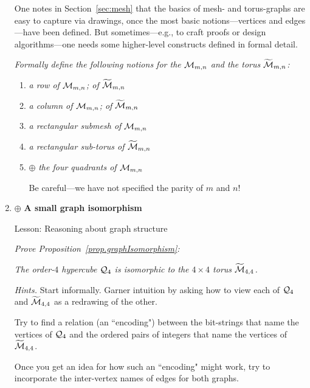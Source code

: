 \begin{enumerate}
One notes in Section~\ref{sec:mesh} that the basics of mesh- and torus-graphs are easy to capture via drawings, once the most basic notions---vertices and edges---have been defined.  But sometimes---e.g., to craft proofs or design algorithms---one needs some higher-level constructs defined in formal detail.

\smallskip

{\em Formally define the following notions for the $\mbox{$\cal M$}_{m,n}$ and the torus $\widetilde{\mbox{$\cal M$}}_{m,n}$:}
  \begin{enumerate}
  \item
{\em a {\em row} of $\mbox{$\cal M$}_{m,n}$; of $\widetilde{\mbox{$\cal M$}}_{m,n}$}
  \medskip\item
{\em a {\em column} of $\mbox{$\cal M$}_{m,n}$; of $\widetilde{\mbox{$\cal M$}}_{m,n}$}
  \medskip\item
{\em a {\em rectangular submesh} of $\mbox{$\cal M$}_{m,n}$}
  \medskip\item
{\em a {\em rectangular sub-torus} of $\widetilde{\mbox{$\cal M$}}_{m,n}$}
  \medskip\item
$\oplus$
{\em the {\em four quadrants} of $\mbox{$\cal M$}_{m,n}$}

\smallskip

Be careful---we have not specified the parity of $m$ and $n$!
  \end{enumerate}

\medskip\item
$\oplus$
{\bf A small graph isomorphism}

{\sc Lesson:} Reasoning about graph structure

\smallskip

{\em Prove Proposition~\ref{prop.graphIsomorphism}:}

\smallskip

{\em The order-$4$ hypercube $\mbox{$\cal Q$}_4$ is \textit{isomorphic} to the $4 \times 4$ torus $\widetilde{\mbox{$\cal M$}}_{4,4}$.}

\medskip

{\it Hints.}
Start informally.  Garner intuition by asking how to view each of $\mbox{$\cal Q$}_4$ and $\widetilde{\mbox{$\cal M$}}_{4,4}$ as a redrawing of the other.

\smallskip

Try to find a relation (an ``encoding") between the bit-strings that name the vertices of $\mbox{$\cal Q$}_4$ and the ordered pairs of integers that name the vertices of $\widetilde{\mbox{$\cal M$}}_{4,4}$.

\smallskip 

Once you get an idea for how such an ``encoding" might work, try to incorporate the inter-vertex names of edges for both graphs.


\end{enumerate}
